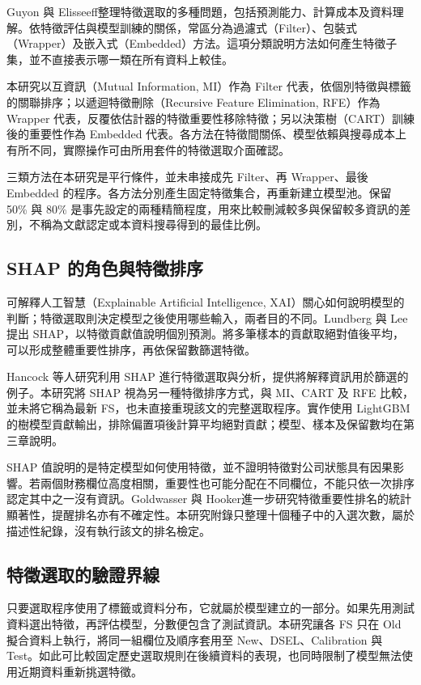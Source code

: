 Guyon 與 Elisseeff\autocite{guyon2003selection}整理特徵選取的多種問題，包括預測能力、計算成本及資料理解。依特徵評估與模型訓練的關係，常區分為過濾式（Filter）、包裝式（Wrapper）及嵌入式（Embedded）方法。這項分類說明方法如何產生特徵子集，並不直接表示哪一類在所有資料上較佳。

本研究以互資訊（Mutual Information, MI）作為 Filter 代表，依個別特徵與標籤的關聯排序；以遞迴特徵刪除（Recursive Feature Elimination, RFE）作為 Wrapper 代表，反覆依估計器的特徵重要性移除特徵；另以決策樹（CART）訓練後的重要性作為 Embedded 代表。各方法在特徵間關係、模型依賴與搜尋成本上有所不同，實際操作可由所用套件的特徵選取介面確認\autocite{sklearn-fs-docs}。

三類方法在本研究是平行條件，並未串接成先 Filter、再 Wrapper、最後 Embedded 的程序。各方法分別產生固定特徵集合，再重新建立模型池。保留 50\% 與 80\% 是事先設定的兩種精簡程度，用來比較刪減較多與保留較多資訊的差別，不稱為文獻認定或本資料搜尋得到的最佳比例。

\subsection{SHAP 的角色與特徵排序}

可解釋人工智慧（Explainable Artificial Intelligence, XAI）關心如何說明模型的判斷；特徵選取則決定模型之後使用哪些輸入，兩者目的不同。Lundberg 與 Lee\autocite{lundberg2017shap}提出 SHAP，以特徵貢獻值說明個別預測。將多筆樣本的貢獻取絕對值後平均，可以形成整體重要性排序，再依保留數篩選特徵。

Hancock 等人\autocite{hancock2025shapfs}研究利用 SHAP 進行特徵選取與分析，提供將解釋資訊用於篩選的例子。本研究將 SHAP 視為另一種特徵排序方式，與 MI、CART 及 RFE 比較，並未將它稱為最新 FS，也未直接重現該文的完整選取程序。實作使用 LightGBM 的樹模型貢獻輸出，排除偏置項後計算平均絕對貢獻；模型、樣本及保留數均在第三章說明。

SHAP 值說明的是特定模型如何使用特徵，並不證明特徵對公司狀態具有因果影響。若兩個財務欄位高度相關，重要性也可能分配在不同欄位，不能只依一次排序認定其中之一沒有資訊。Goldwasser 與 Hooker\autocite{goldwasser2025rankings}進一步研究特徵重要性排名的統計顯著性，提醒排名亦有不確定性。本研究附錄只整理十個種子中的入選次數，屬於描述性紀錄，沒有執行該文的排名檢定。

\subsection{特徵選取的驗證界線}

只要選取程序使用了標籤或資料分布，它就屬於模型建立的一部分。如果先用測試資料選出特徵，再評估模型，分數便包含了測試資訊。本研究讓各 FS 只在 Old 擬合資料上執行，將同一組欄位及順序套用至 New、DSEL、Calibration 與 Test。如此可比較固定歷史選取規則在後續資料的表現，也同時限制了模型無法使用近期資料重新挑選特徵。

